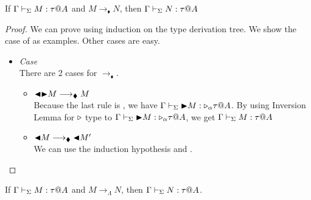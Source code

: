 \begin{theorem}
	If $\G\V M:\tau@A$ and $M\longrightarrow_\blacklozenge N$, then $\G\V N:\tau@A$\\
\end{theorem}
	
\begin{proof}
	We can prove using induction on the type derivation tree.
	We show the case of \TTBL{} as examples.
	Other cases are easy.
	\begin{itemize}
		\newcommand{\R}{\longrightarrow_{\blacklozenge}}
																	
		\item \textit{Case} \TTBL{}\\
		      There are 2 cases for $\R$.
		      \begin{itemize}
		      	\item $\TBL\TB M \R M$\\
		      	      Because the last rule is \TTBL, we have $\Gamma \vdash_\Sigma {\mathop{\blacktriangleright}} M : {\mathop{\triangleright}}_\alpha \tau @A$.
		      	      By using Inversion Lemma for ${\mathop{\triangleright}}$ type to $\Gamma \vdash_\Sigma {\mathop{\blacktriangleright}} M : {\mathop{\triangleright}}_\alpha \tau @A$,
		      	      we get $\Gamma \vdash_\Sigma M : \tau @A$
		      	\item $\TBL M \R \TBL M'$\\
		      	      We can use the induction hypothesis and \TTBL.
		      \end{itemize}
	\end{itemize}
\end{proof}
	

\begin{theorem}
	If $\G\V M:\tau@A$ and $M \longrightarrow_{\Lambda} N$, then $\G\V N:\tau@A$.
\end{theorem}
	
